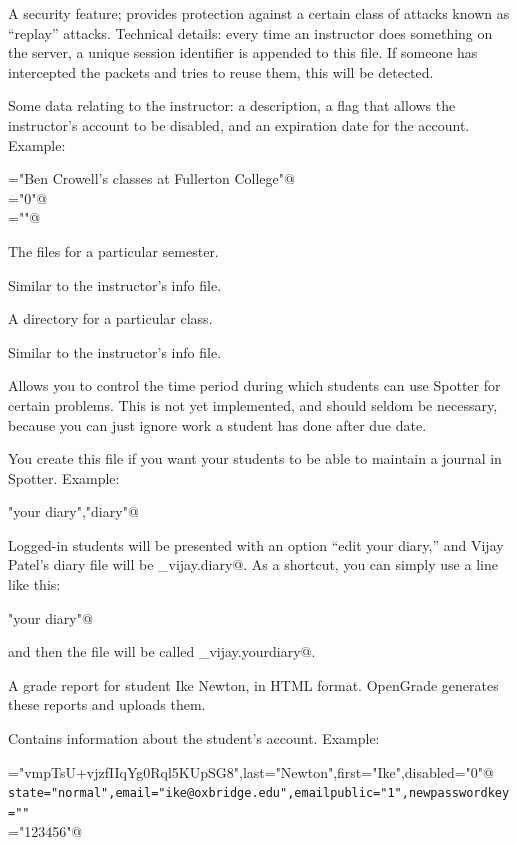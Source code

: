 \documentclass{doc}
\begin{document}
 A security feature; provides protection against a certain
class of attacks known as ``replay'' attacks. Technical details: every time an instructor does something
on the server, a unique session identifier is appended to this file. If someone
has intercepted the packets and tries to reuse them, this will be detected.

 Some data relating to the instructor: a description, a flag that allows the
instructor's account to be disabled, and an expiration date for the account.
Example:

\verb@description="Ben Crowell's classes at Fullerton College"@\\
\verb@disable="0"@\\
\verb@expire=""@

 The files for a particular semester.

 Similar to the instructor's info file.

 A directory for a particular class.

 Similar to the instructor's info file.

 Allows you to control the time period during which students can use
Spotter for certain problems. This is not yet implemented, and should seldom be
necessary, because you can just ignore work a student has done after
due date.

 You create this file if you want your students to be able to
maintain a journal in Spotter. Example:

\verb@"your diary","diary"@

\noindent Logged-in students will be presented with an option ``edit your diary,''
and Vijay Patel's diary file will be \verb@patel_vijay.diary@.
As a shortcut, you can simply use a line like this:

\verb@"your diary"@

\noindent and then the file will be called \verb@patel_vijay.yourdiary@.

 A grade report for student Ike Newton, in HTML
format. OpenGrade generates these reports and uploads them.

 Contains information about the student's account.
Example:

\verb@password="vmpTsU+vjzfIIqYg0Rql5KUpSG8",last="Newton",first="Ike",disabled="0"@\\
\verb|state="normal",email="ike@oxbridge.edu",emailpublic="1",newpasswordkey=""|\\
\verb@id="123456"@
\end{document}
